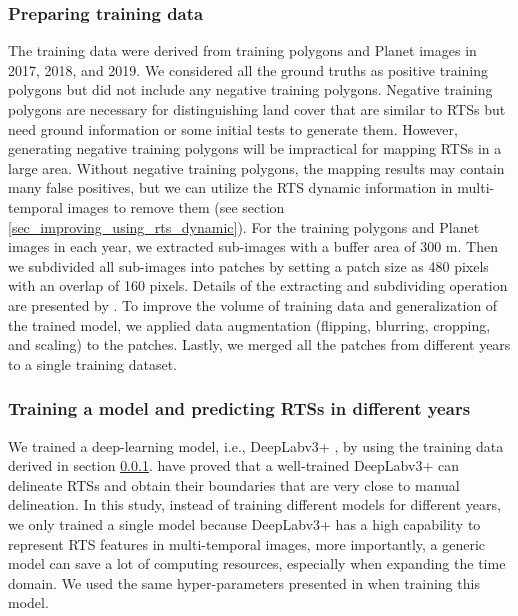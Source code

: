 \documentclass[authoryear,preprint,review,12pt]{elsarticle}
\begin{document}

\subsubsection{Preparing training data} 
\label{sec_prepare_training}


The training data were derived from training polygons and Planet images in 2017, 2018, and 2019. 
We considered all the ground truths as positive training polygons but did not include any negative training polygons. 
Negative training polygons are necessary for distinguishing land cover that are similar to RTSs but need ground information or some initial tests to generate them. 
However, generating negative training polygons will be impractical for mapping RTSs in a large area. 
Without negative training polygons, the mapping results may contain many false positives, but we can utilize the RTS dynamic information in multi-temporal images to remove them (see section \ref{sec_improving_using_rts_dynamic}).
For the training polygons and Planet images in each year, we extracted sub-images with a buffer area of 300 m. 
Then we subdivided all sub-images into patches by setting a patch size as 480 pixels with an overlap of 160 pixels. 
Details of the extracting and subdividing operation are presented by \cite{huang2018automatic}.
To improve the volume of training data and generalization of the trained model, we applied data augmentation (flipping, blurring, cropping, and scaling) to the patches. 
Lastly, we merged all the patches from different years to a single training dataset. 


\subsubsection{Training a model and predicting RTSs in different years}
\label{sec_train_prediction}

We trained a deep-learning model, i.e., DeepLabv3+ \citep{chen2018encoder-decoder}, by using the training data derived in section \ref{sec_prepare_training}. 
\cite{huang2020using} have proved that a well-trained DeepLabv3+ can delineate RTSs and obtain their boundaries that are very close to manual delineation. 
In this study, instead of training different models for different years, we only trained a single model because DeepLabv3+ has a high capability to represent RTS features in multi-temporal images, more importantly, a generic model can save a lot of computing resources, especially when expanding the time domain.
We used the same hyper-parameters presented in \cite{huang2020using} when training this model. 
\end{document}
